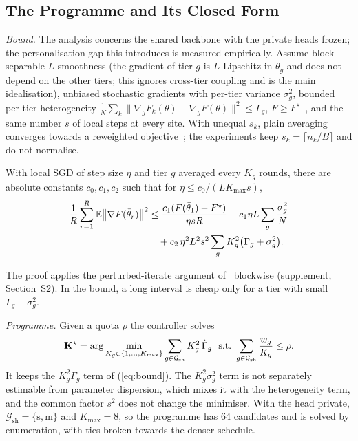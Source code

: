 \subsection{The Programme and Its Closed Form}
\emph{Bound.} The analysis concerns the shared backbone with the private heads frozen; the personalisation gap this introduces is measured empirically. Assume block-separable $L$-smoothness (the gradient of tier $g$ is $L$-Lipschitz in $\theta_g$ and does not depend on the other tiers; this ignores cross-tier coupling and is the main idealisation), unbiased stochastic gradients with per-tier variance $\sigma_g^2$, bounded per-tier heterogeneity $\frac1N\sum_k\|\nabla_gF_k(\theta)-\nabla_gF(\theta)\|^2\le\Gamma_g$, $F\ge F^\star$~\cite{stich2019,wang2021coop}, and the same number $s$ of local steps at every site. With unequal $s_k$, plain averaging converges towards a reweighted objective~\cite{wang2020fednova}; the experiments keep $s_k=\lceil n_k/B\rceil$ and do not normalise.
\begin{proposition}
\label{prop:bound}
With local SGD of step size $\eta$ and tier $g$ averaged every $K_g$ rounds, there are absolute constants $c_0,c_1,c_2$ such that for $\eta\le c_0/(LK_{\max}s)$,
\begin{align}
\frac1R\sum_{r=1}^R\mathbb E\big\|\nabla F(\bar\theta_r)\big\|^2
&\le \frac{c_1(F(\bar\theta_1)-F^\star)}{\eta sR}+c_1\eta L\sum_g\frac{\sigma_g^2}{N}\notag\\
&\quad+c_2\,\eta^2L^2s^2\sum_g K_g^2\big(\Gamma_g+\sigma_g^2\big).
\label{eq:bound}
\end{align}
\end{proposition}
The proof applies the perturbed-iterate argument of~\cite{wang2021coop} blockwise (supplement, Section~S2). In the bound, a long interval is cheap only for a tier with small $\Gamma_g+\sigma_g^2$.

\emph{Programme.} Given a quota $\rho$ the controller solves
\begin{equation}
\mathbf K^\star=\arg\min_{K_g\in\{1,\dots,K_{\max}\}}\sum_{g\in\mathcal G_{\mathrm{sh}}}K_g^2\,\hat\Gamma_g\ \ \text{s.t.}\ \sum_{g\in\mathcal G_{\mathrm{sh}}}\frac{w_g}{K_g}\le\rho .
\label{eq:ip}
\end{equation}
It keeps the $K_g^2\Gamma_g$ term of (\ref{eq:bound}). The $K_g^2\sigma_g^2$ term is not separately estimable from parameter dispersion, which mixes it with the heterogeneity term, and the common factor $s^2$ does not change the minimiser. With the head private, $\mathcal G_{\mathrm{sh}}=\{\mathrm s,\mathrm m\}$ and $K_{\max}=8$, so the programme has 64 candidates and is solved by enumeration, with ties broken towards the denser schedule.

